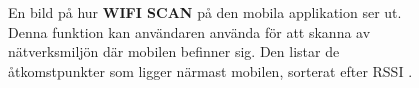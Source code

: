 \documentclass[a4paper,12pt]{article}
\begin{document}
 \begin{figure}[H]
   \centering
   \caption{En bild på hur \textbf{WIFI SCAN} på den mobila applikation ser ut. Denna funktion kan användaren använda för att skanna av nätverksmiljön där mobilen befinner sig. Den listar de åtkomstpunkter som ligger närmast mobilen, sorterat efter RSSI \cite{RSSI_expl}.}
   \label{fig:mob_scan_cal}
 \end{figure}
\end{document}
